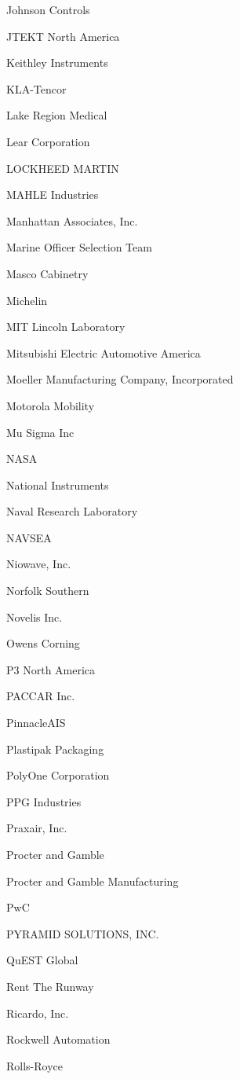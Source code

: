 \documentclass[twoside]{article}
\begin{document}
\begin{center}
\begin{multicols}{5}
\begin{FlushLeft}
\begin{compactitem}
\item Johnson Controls
\item JTEKT North America
\item Keithley Instruments
\item KLA-Tencor
\item Lake Region Medical
\item Lear Corporation
\item LOCKHEED MARTIN
\item MAHLE Industries
\item Manhattan Associates, Inc.
\item Marine Officer Selection Team
\item Masco Cabinetry
\item Michelin
\item MIT Lincoln Laboratory
\item Mitsubishi Electric Automotive America
\item Moeller Manufacturing Company, Incorporated
\item Motorola Mobility
\item Mu Sigma Inc
\item NASA
\item National Instruments
\item Naval Research Laboratory
\item NAVSEA
\item Niowave, Inc.
\item Norfolk Southern
\item Novelis Inc.
\item Owens Corning
\item P3 North America
\item PACCAR Inc.
\item PinnacleAIS
\item Plastipak Packaging
\item PolyOne Corporation
\item PPG Industries
\item Praxair, Inc.
\item Procter and Gamble
\item Procter and Gamble Manufacturing
\item PwC
\item PYRAMID SOLUTIONS, INC.
\item QuEST Global
\item Rent The Runway
\item Ricardo, Inc.
\item Rockwell Automation
\item Rolls-Royce

\end{compactitem}
\end{FlushLeft}
\end{multicols}
\end{center}
\end{document}
